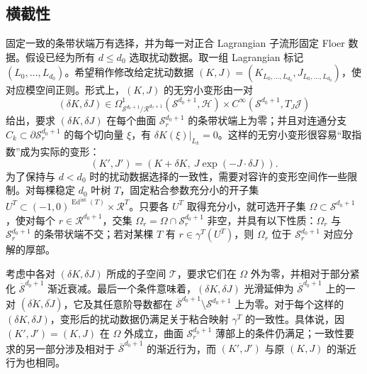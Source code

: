 \subsection{横截性}\label{sec:9k}
固定一致的条带状端万有选择，并为每一对正合 Lagrangian 子流形固定 Floer 数据。假设已经为所有 $d\leq d_0$ 选取扰动数据。取一组 Lagrangian 标记 $(L_0,\ldots,L_{d_0})$。希望稍作修改给定扰动数据 $(K,J)=(K_{L_0,\ldots,L_{d_0}},J_{L_0,\ldots,L_{d_0}})$，使对应模空间正则。形式上，$(K,J)$ 的无穷小变形由一对
\begin{equation}\label{eq:9.24}
(\delta K,\delta J)\in\Omega^1_{\mathcal S^{d_0+1}/\mathcal R^{d_0+1}}(\mathcal S^{d_0+1},\mathcal H)
\times C^\infty(\mathcal S^{d_0+1},T_J\mathcal J)
\end{equation}
给出，要求 $(\delta K,\delta J)$ 在每个曲面 $\mathcal S_r^{d_0+1}$ 的条带状端上为零；并且对连通分支 $C_k\subset\partial\mathcal S_r^{d_0+1}$ 的每个切向量 $\xi$，有 $\delta K(\xi)|_{L_k}=0$。这样的无穷小变形很容易“取指数”成为实际的变形：
\begin{equation}\label{eq:9.25}
(K',J')=(K+\delta K,\ J\exp(-J\cdot\delta J)).
\end{equation}
为了保持与 $d<d_0$ 时的扰动数据选择的一致性，需要对容许的变形空间作一些限制。对每棵稳定 $d_0$ 叶树 $T$，固定粘合参数充分小的开子集 $U^T\subset(-1,0)^{\operatorname{Ed}^{\mathrm{int}}(T)}\times\mathcal R^T$。只要各 $U^T$ 取得充分小，就可选开子集 $\Omega\subset\mathcal S^{d_0+1}$，使对每个 $r\in\mathcal R^{d_0+1}$，交集 $\Omega_r=\Omega\cap\mathcal S_r^{d_0+1}$ 非空，并具有以下性质：$\Omega_r$ 与 $\mathcal S_r^{d_0+1}$ 的条带状端不交；若对某棵 $T$ 有 $r\in\gamma^T(U^T)$，则 $\Omega_r$ 位于 $\mathcal S_r^{d_0+1}$ 对应分解的厚部。

考虑中各对 $(\delta K,\delta J)$ 所成的子空间 $\mathcal T$，要求它们在 $\Omega$ 外为零，并相对于部分紧化 $\overline{\mathcal S}^{d_0+1}$ 渐近衰减。最后一个条件意味着，$(\delta K,\delta J)$ 光滑延伸为 $\overline{\mathcal S}^{d_0+1}$ 上的一对 $(\overline{\delta K},\overline{\delta J})$，它及其任意阶导数都在 $\overline{\mathcal S}^{d_0+1}\setminus\mathcal S^{d_0+1}$ 上为零。对于每个这样的 $(\delta K,\delta J)$，变形后的扰动数据仍满足关于粘合映射 $\gamma^T$ 的一致性。具体说，因 $(K',J')=(K,J)$ 在 $\Omega$ 外成立，曲面 $\mathcal S_r^{d_0+1}$ 薄部上的条件仍满足；一致性要求的另一部分涉及相对于 $\overline{\mathcal S}^{d_0+1}$ 的渐近行为，而 $(K',J')$ 与原 $(K,J)$ 的渐近行为也相同。

